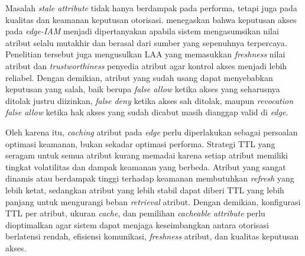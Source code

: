 Masalah \textit{stale attribute} tidak hanya berdampak pada performa, tetapi juga pada kualitas dan keamanan keputusan otorisasi. \textcite{wang_edge-enabled_2025} menegaskan bahwa keputusan akses pada \textit{edge-IAM} menjadi dipertanyakan apabila sistem mengasumsikan nilai atribut selalu mutakhir dan berasal dari sumber yang sepenuhnya terpercaya. Penelitian tersebut juga mengusulkan LAA yang memasukkan \textit{freshness} nilai atribut dan \textit{trustworthiness} penyedia atribut agar kontrol akses menjadi lebih reliabel. Dengan demikian, atribut yang sudah usang dapat menyebabkan keputusan yang salah, baik berupa \textit{false allow} ketika akses yang seharusnya ditolak justru diizinkan, \textit{false deny} ketika akses sah ditolak, maupun \textit{revocation false allow} ketika hak akses yang sudah dicabut masih dianggap valid di \textit{edge}.

Oleh karena itu, \textit{caching} atribut pada \textit{edge} perlu diperlakukan sebagai persoalan optimasi keamanan, bukan sekadar optimasi performa. Strategi TTL yang seragam untuk semua atribut kurang memadai karena setiap atribut memiliki tingkat volatilitas dan dampak keamanan yang berbeda. Atribut yang sangat dinamis atau berdampak tinggi terhadap keamanan membutuhkan \textit{refresh} yang lebih ketat, sedangkan atribut yang lebih stabil dapat diberi TTL yang lebih panjang untuk mengurangi beban \textit{retrieval} atribut. Dengan demikian, konfigurasi TTL per atribut, ukuran \textit{cache}, dan pemilihan \textit{cacheable attribute} perlu dioptimalkan agar sistem dapat menjaga keseimbangkan antara otorisasi berlatensi rendah, efisiensi komunikasi, \textit{freshness} atribut, dan kualitas keputusan akses.